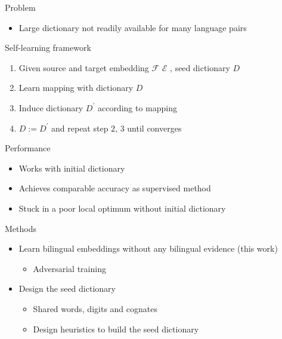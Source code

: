 \documentclass[11pt, a4paper, landscape]{article}
\begin{document}
	\NewPage
	\vfill
	Problem
	\begin{itemize}
		\item Large dictionary not readily available for many language pairs\\
	\end{itemize}
	Self-learning framework \cite{artetxe2017learning}
	\begin{enumerate}
		\item Given source and target embedding ${\mathcal{F}}$ ${\mathcal{E}}$ , seed dictionary $D$
		\item Learn mapping with dictionary $D$
		\item Induce dictionary $D^{\prime}$ according to mapping
		\item ${D:=D^{\prime}}$ and repeat step $2$, $3$ until converges\\
	\end{enumerate}
	
	Performance
	\begin{itemize}
		\item Works with initial dictionary		
		\item Achieves comparable accuracy as supervised method
		\item Stuck in a poor local optimum without initial dictionary
	\end{itemize}
	
	\vfill
	
	\NewPage
	\vfill

		
	
	Methods
	\begin{itemize}
		\item 	Learn bilingual embeddings without any bilingual evidence (this work)
		\begin{itemize}
			\item Adversarial training	\cite{conneau2017word}
		\end{itemize}
		\item Design the seed dictionary
		\begin{itemize}
			\item Shared words, digits and cognates \cite{artetxe2017learning}
			\item Design heuristics to 
			build the seed dictionary \\ \cite{hoshen2018iterative} \cite{artetxe2018robust}
		\end{itemize}
		
	\end{itemize}
	\vfill
	
\end{document}
